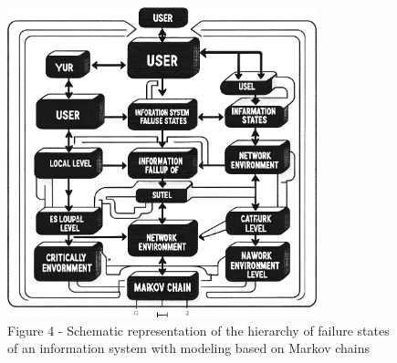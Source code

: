 \begin{figure}[H]
	\centering
	\includegraphics[width=0.8\textwidth]{assets/46}
	\caption*{Figure 4 - Schematic representation of the hierarchy of failure states of an information system with modeling based on Markov chains}
\end{figure}

